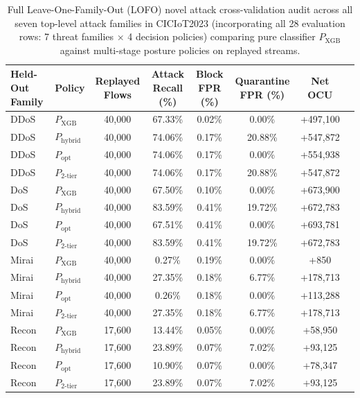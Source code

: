 \documentclass[journal,10pt,onecolumn]{IEEEtran}
\begin{document}
\begin{table}[t]
\caption{Full Leave-One-Family-Out (LOFO) novel attack cross-validation audit across all seven top-level attack families in CICIoT2023 (incorporating all 28 evaluation rows: 7 threat families $\times$ 4 decision policies) comparing pure classifier $P_{\text{XGB}}$ against multi-stage posture policies on replayed streams.}
\label{tab:lofo_full}
\centering
\small
\begin{tabular}{llcccccc}
\toprule
\textbf{Held-Out Family} & \textbf{Policy} & \textbf{Replayed Flows} & \textbf{Attack Recall (\%)} & \textbf{Block FPR (\%)} & \textbf{Quarantine FPR (\%)} & \textbf{Net OCU} \\
\midrule
DDoS & $P_{\text{XGB}}$ & 40,000 & 67.33\% & 0.02\% & 0.00\% & +497,100 \\
DDoS & $P_{\text{hybrid}}$ & 40,000 & 74.06\% & 0.17\% & 20.88\% & +547,872 \\
DDoS & $P_{\text{opt}}$ & 40,000 & 74.06\% & 0.17\% & 0.00\% & +554,938 \\
DDoS & $P_{2\text{-tier}}$ & 40,000 & 74.06\% & 0.17\% & 20.88\% & +547,872 \\
\midrule
DoS & $P_{\text{XGB}}$ & 40,000 & 67.50\% & 0.10\% & 0.00\% & +673,900 \\
DoS & $P_{\text{hybrid}}$ & 40,000 & 83.59\% & 0.41\% & 19.72\% & +672,783 \\
DoS & $P_{\text{opt}}$ & 40,000 & 67.51\% & 0.41\% & 0.00\% & +693,781 \\
DoS & $P_{2\text{-tier}}$ & 40,000 & 83.59\% & 0.41\% & 19.72\% & +672,783 \\
\midrule
Mirai & $P_{\text{XGB}}$ & 40,000 & 0.27\% & 0.19\% & 0.00\% & +850 \\
Mirai & $P_{\text{hybrid}}$ & 40,000 & 27.35\% & 0.18\% & 6.77\% & +178,713 \\
Mirai & $P_{\text{opt}}$ & 40,000 & 0.26\% & 0.18\% & 0.00\% & +113,288 \\
Mirai & $P_{2\text{-tier}}$ & 40,000 & 27.35\% & 0.18\% & 6.77\% & +178,713 \\
\midrule
Recon & $P_{\text{XGB}}$ & 17,600 & 13.44\% & 0.05\% & 0.00\% & +58,950 \\
Recon & $P_{\text{hybrid}}$ & 17,600 & 23.89\% & 0.07\% & 7.02\% & +93,125 \\
Recon & $P_{\text{opt}}$ & 17,600 & 10.90\% & 0.07\% & 0.00\% & +78,347 \\
Recon & $P_{2\text{-tier}}$ & 17,600 & 23.89\% & 0.07\% & 7.02\% & +93,125 \\

\end{tabular}
\end{table}
\end{document}
